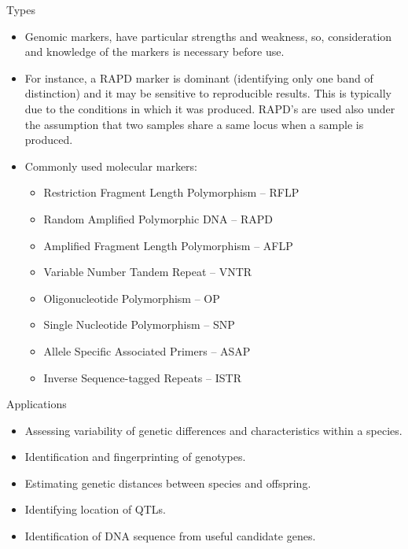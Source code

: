 \documentclass[
  ignorenonframetext,
  aspectratio=169]{beamer}
\providecommand{\tightlist}{%
  \setlength{\itemsep}{0pt}\setlength{\parskip}{0pt}}
\begin{document}
\begin{frame}{Types}
\protect\hypertarget{types}{}
\footnotesize

\begin{itemize}
\tightlist
\item
  Genomic markers, have particular strengths and weakness, so,
  consideration and knowledge of the markers is necessary before use.
\item
  For instance, a RAPD marker is dominant (identifying only one band of
  distinction) and it may be sensitive to reproducible results. This is
  typically due to the conditions in which it was produced. RAPD's are
  used also under the assumption that two samples share a same locus
  when a sample is produced.
\item
  Commonly used molecular markers:

  \begin{itemize}
  \tightlist
  \item
    Restriction Fragment Length Polymorphism -- RFLP
  \item
    Random Amplified Polymorphic DNA -- RAPD
  \item
    Amplified Fragment Length Polymorphism -- AFLP
  \item
    Variable Number Tandem Repeat -- VNTR
  \item
    Oligonucleotide Polymorphism -- OP
  \item
    Single Nucleotide Polymorphism -- SNP
  \item
    Allele Specific Associated Primers -- ASAP
  \item
    Inverse Sequence-tagged Repeats -- ISTR
  \end{itemize}
\end{itemize}
\end{frame}

\begin{frame}{Applications}
\protect\hypertarget{applications}{}
\begin{itemize}
\tightlist
\item
  Assessing variability of genetic differences and characteristics
  within a species.
\item
  Identification and fingerprinting of genotypes.
\item
  Estimating genetic distances between species and offspring.
\item
  Identifying location of QTLs.
\item
  Identification of DNA sequence from useful candidate genes.
\end{itemize}
\end{frame}
\end{document}
